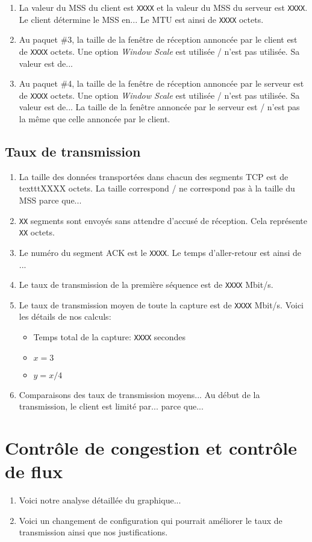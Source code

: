\documentclass[]{article}
\begin{document}
\begin{enumerate}
      \item La valeur du MSS du client est \texttt{XXXX} et la valeur du MSS du serveur est \texttt{XXXX}.
            Le client détermine le MSS en... Le MTU est ainsi de \texttt{XXXX} octets.
      \item Au paquet \#3, la taille de la fenêtre de réception annoncée par le client est de \texttt{XXXX}
            octets. Une option \textit{Window Scale} est utilisée / n'est pas utilisée. Sa valeur est de...
      \item Au paquet \#4, la taille de la fenêtre de réception annoncée par le serveur est de \texttt{XXXX}
            octets. Une option \textit{Window Scale} est utilisée / n'est pas utilisée. Sa valeur est de...
            La taille de la fenêtre annoncée par le serveur est / n'est pas la même que celle annoncée par
            le client.
\end{enumerate}

\subsection*{Taux de transmission}

\begin{enumerate}
      \item La taille des données transportées dans chacun des segments TCP est de texttt{XXXX} octets.
            La taille correspond / ne correspond pas à la taille du MSS parce que...

      \item \texttt{XX} segments sont envoyés sans attendre d'accusé de réception. Cela représente \texttt{XX}
            octets.
      \item Le numéro du segment ACK est le \texttt{XXXX}. Le temps d'aller-retour est ainsi de ...
      \item Le taux de transmission de la première séquence est de \texttt{XXXX} Mbit/s.
      \item Le taux de transmission moyen de toute la capture est de \texttt{XXXX} Mbit/s. Voici les détails
            de nos calculs:
            \begin{itemize}
                  \item Temps total de la capture: \texttt{XXXX} secondes
                  \item $x = 3$
                  \item $y = x/4$
            \end{itemize}
      \item Comparaisons des taux de transmission moyens... Au début de la transmission, le client est limité
            par... parce que...
\end{enumerate}

\section*{Contrôle de congestion et contrôle de flux}

\begin{enumerate}
      \item Voici notre analyse détaillée du graphique...
      \item Voici un changement de configuration qui pourrait améliorer le taux de transmission ainsi que nos
            justifications.
\end{enumerate}
\end{document}
